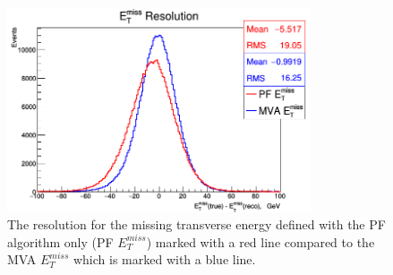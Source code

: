 \begin{figure}[t]
  \centering
  \includegraphics[width=0.8\textwidth]{04_event_reconstruction/plots/MET_res.png}
  \caption{The resolution for the missing transverse energy defined with the PF algorithm only (PF $E_{T}^{miss}$)
  marked with a red line compared to the MVA $E_{T}^{miss}$ which is marked with a blue line.}
  \label{fig:METres}
\end{figure}


% 
% 
% 
% 

